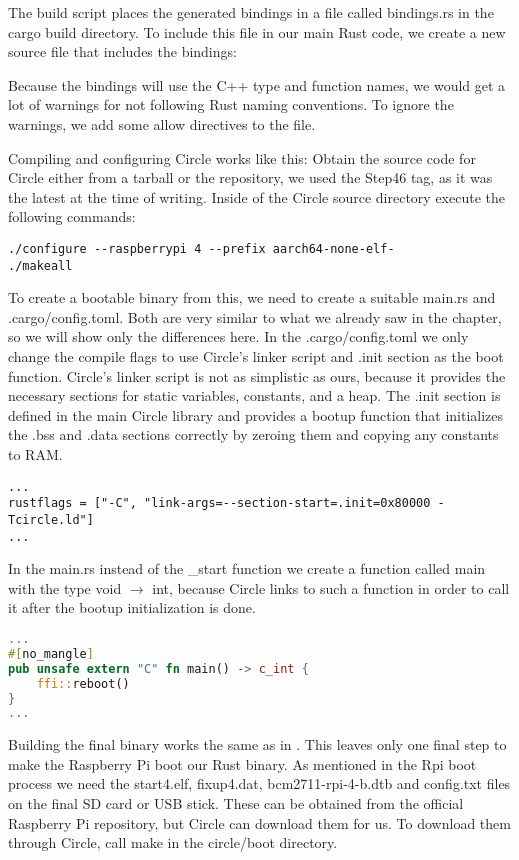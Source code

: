 The build script places the generated bindings in a file called bindings.rs in the cargo build directory.
To include this file in our main Rust code, we create a new source file that includes the bindings:


Because the bindings will use the C++ type and function names, we would get a lot of warnings for not following Rust naming conventions.
To ignore the warnings, we add some allow directives to the file.

Compiling and configuring Circle works like this:
Obtain the source code for Circle either from a tarball or the repository, we used the Step46 tag, as it was the latest at the time of writing.
Inside of the Circle source directory execute the following commands:
\begin{verbatim}
./configure --raspberrypi 4 --prefix aarch64-none-elf-
./makeall
\end{verbatim}

To create a bootable binary from this, we need to create a suitable main.rs and .cargo/config.toml.
Both are very similar to what we already saw in the  chapter, so we will show only the differences here.
In the .cargo/config.toml we only change the compile flags to use Circle's linker script and .init section as the boot function.
Circle's linker script is not as simplistic as ours, because it provides the necessary sections for static variables, constants, and a heap.
The .init section is defined in the main Circle library and provides a bootup function that initializes the .bss and .data sections correctly by zeroing them and copying any constants to RAM.
\begin{verbatim}
...
rustflags = ["-C", "link-args=--section-start=.init=0x80000 -Tcircle.ld"]
...
\end{verbatim}

In the main.rs instead of the \_start function we create a function called main with the type void $\rightarrow$ int,
because Circle links to such a function in order to call it after the bootup initialization is done.
\begin{lstlisting}[language=Rust,style=colouredRust]
...
#[no_mangle]
pub unsafe extern "C" fn main() -> c_int {
    ffi::reboot()
}
...
\end{lstlisting}

Building the final binary works the same as in .
This leaves only one final step to make the Raspberry Pi boot our Rust binary.
As mentioned in the Rpi boot process we need the start4.elf, fixup4.dat, bcm2711-rpi-4-b.dtb and config.txt files on the final SD card or USB stick.
These can be obtained from the official Raspberry Pi repository, but Circle can download them for us.
To download them through Circle, call make in the circle/boot directory.

